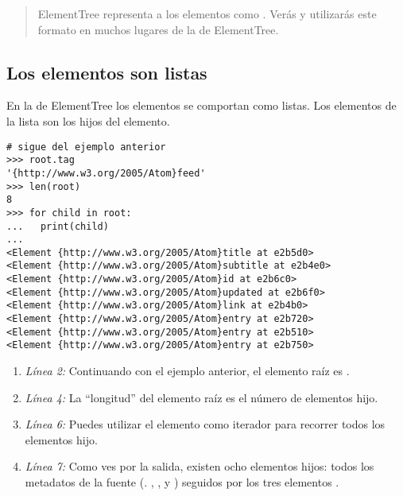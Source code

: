 \begin{quote}
ElementTree representa a los elementos  como . Verás y utilizarás este formato en muchos lugares de la  de ElementTree.
\end{quote}

\subsection{Los elementos son listas}

En la  de ElementTree los elementos se comportan como listas. Los elementos de la lista son los hijos del elemento.

\noindent\begin{minipage}{\textwidth}
\begin{lstlisting}[mathescape=True]
# sigue del ejemplo anterior
>>> root.tag
'{http://www.w3.org/2005/Atom}feed'
>>> len(root)
8
>>> for child in root:
...   print(child)
... 
<Element {http://www.w3.org/2005/Atom}title at e2b5d0>
<Element {http://www.w3.org/2005/Atom}subtitle at e2b4e0>
<Element {http://www.w3.org/2005/Atom}id at e2b6c0>
<Element {http://www.w3.org/2005/Atom}updated at e2b6f0>
<Element {http://www.w3.org/2005/Atom}link at e2b4b0>
<Element {http://www.w3.org/2005/Atom}entry at e2b720>
<Element {http://www.w3.org/2005/Atom}entry at e2b510>
<Element {http://www.w3.org/2005/Atom}entry at e2b750>
\end{lstlisting}
\end{minipage}

\begin{enumerate}

  \item \emph{Línea 2:} Continuando con el ejemplo anterior, el elemento raíz es .

\item \emph{Línea 4:} La ``longitud'' del elemento raíz es el número de elementos hijo.

\item \emph{Línea 6:} Puedes utilizar el elemento como iterador para recorrer todos los elementos hijo.

\item \emph{Línea 7:} Como ves por la salida, existen ocho elementos hijos: todos los metadatos de la fuente (. , ,  y ) seguidos por los tres elementos .

\end{enumerate}

